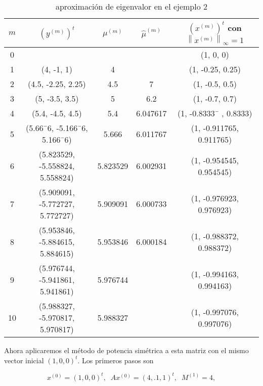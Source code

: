 \documentclass[12pt, a4paper]{article}
\numberwithin{subsection}{section} %
\begin{document}
            \begin{table}[h!]
                \centering
                \caption{aproximación de eigenvalor en el ejemplo 2}
                \label{tab:ej2}
                \begin{tabular}{|ccccc|} \hline
                    $m$ & $(y^{(m)})^t$ & $\mu^{(m)}$ & $\hat{\mu}^{(m)}$ & $(x^{(m)})^t$ con $\left\|x^{(m)}\right\|_{\infty} = 1$ \\ \hline
                    0  &                                   &            &           &  (1, 0, 0) \\
                    1  &  (4, -1, 1)                       &  4         &           &  (1, -0.25, 0.25) \\
                    2  &  (4.5, -2.25, 2.25)               &  4.5       & 7         &  (1, -0.5, 0.5) \\
                    3  &  (5, -3.5, 3.5)                   &  5         & 6.2       &  (1, -0.7, 0.7) \\
                    4  &  (5.4, -4.5, 4.5)                 &  5.4       & 6.047617  &  (1, -0.8333¯ , 0.8333) \\
                    5  &  (5.66¯6, -5.166¯6, 5.166¯6)      &  5.666     & 6.011767  &  (1, -0.911765, 0.911765) \\
                    6  &  (5.823529, -5.558824, 5.558824)  &  5.823529  & 6.002931  &  (1, -0.954545, 0.954545) \\
                    7  &  (5.909091, -5.772727, 5.772727)  &  5.909091  & 6.000733  &  (1, -0.976923, 0.976923) \\
                    8  &  (5.953846, -5.884615, 5.884615)  &  5.953846  & 6.000184  &  (1, -0.988372, 0.988372) \\
                    9  &  (5.976744, -5.941861, 5.941861)  &  5.976744  &           &  (1, -0.994163, 0.994163) \\
                    10 &  (5.988327, -5.970817, 5.970817)  &  5.988327  &           &  (1, -0.997076, 0.997076) \\ \hline
                \end{tabular}
            \end{table}
        
            Ahora aplicaremos el método de potencia simétrica a esta matriz con el mismo vector inicial $(1, 0, 0)^t$. Los primeros pasos son
        
            $$x^{(0)} = (1, 0, 0)^t , \;\; Ax^{(0)} = (4,.1, 1)^t , \;\; M^{(1)} = 4,$$
        
\end{document}
